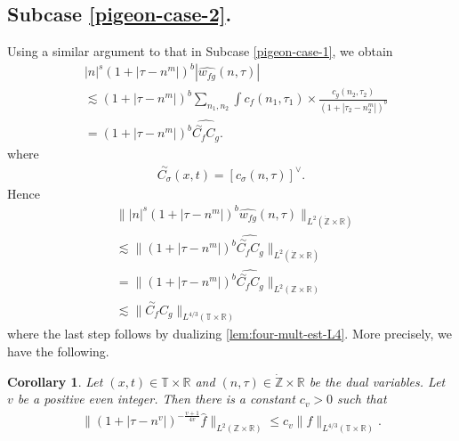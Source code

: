 \documentclass[12pt,reqno]{amsart}
\numberwithin{equation}{section}  %
\numberwithin{figure}{section}
\newcommand{\rr}{\mathbb{R}}
\newcommand{\zz}{\mathbb{Z}}
\newcommand{\ci}{\mathbb{T}}
\newcommand{\zzdot}{\dot{\zz}}
\newcommand{\wh}{\widehat}
\theoremstyle{plain}
\newtheorem{corollary}{Corollary}
\theoremstyle{definition}
\theoremstyle{remark}
\begin{document}
\subsection{Subcase \eqref{pigeon-case-2}.}
Using a similar argument to that in Subcase \eqref{pigeon-case-1}, we obtain
%
%
\begin{equation}
	\label{1f}
	\begin{split}
		 & |n|^s \left( 1 + | \tau - n^{m } | \right)^{b} | \wh{w_{fg}}\left( 
		n, \tau \right) |
		\\
		& \lesssim \left( 1 + | \tau - n^{m } | \right)^{b}
		\sum_{n_1, n_2} \int
		c_f(n_1, \tau_1)
		\times
		\frac{c_g(n_2, \tau_2)}{\left( 1 + | \tau_2 - n_2^{m } | 
		\right)^{b}} 
		\\
		& = \left( 1 + | \tau - n^{m } | \right)^{b} \wh{\overset{\sim}{C_f} C_g}.
	\end{split}
\end{equation}
%
where
%
%
\begin{equation*}
	\begin{split}
		\overset{\sim}{C_\sigma}(x,t) = \left[ c_\sigma(n, \tau) \right]^\vee.
	\end{split}
\end{equation*}
%
%
Hence
%
\begin{equation}
	\label{3f}
	\begin{split}
		& \| |n|^s \left( 1 + | \tau - n^{m } | \right)^{b} \wh{w_{fg}}(n, \tau) 
		\|_{L^2(\zzdot \times \rr)}
		\\
		& \lesssim \|\left( 1 + | \tau - n^{m} | \right)^{b} 
		\wh{\overset{\sim}{C_f} C_g } \|_{L^2(\zzdot \times \rr)}
		\\
		& =  \|\left( 1 + | \tau - n^{m} | \right)^{b} 
		\wh{\overset{\sim}{C_f} C_g } \|_{L^2(\zz \times \rr)}
		\\
		& \lesssim  \|\overset{\sim}{C_f} C_g  \|_{L^{4/3}(\ci \times \rr)}
	\end{split}
\end{equation}
%
where the last step follows by dualizing \autoref{lem:four-mult-est-L4}. More
precisely, we have the following.
\begin{corollary}
	\label{cor:four-mult-est-L4}
	Let $(x, t) \in \ci \times \rr $ and $(n, \tau) \in \zzdot \times \rr$ be 
	the dual variables. Let $v$ be a positive even integer. Then there is a 
	constant $c_v > 0$ such that
%
%
\begin{equation}
	\label{four-mult-est-L4*}
	\begin{split}
		\| \left( 1 + | \tau - n^v | 
		\right)^{-\frac{v+1}{4v}}
		\wh{f}\|_{L^2(\zz \times \rr)} \le c_v \|f \|_{L^{4/3}( \ci \times \rr)}.
	\end{split}
\end{equation}
%
%
\end{corollary}
\end{document}
